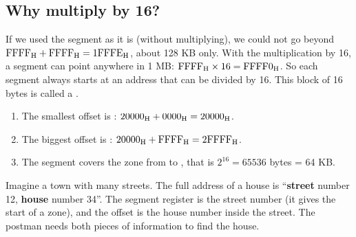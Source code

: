 \begin{center}
\end{center}

\subsection{Why multiply by 16?}
If we used the segment as it is (without multiplying), we could not go beyond $\mbox{FFFF\textsubscript{H}} + \mbox{FFFF\textsubscript{H}} = \mbox{1FFFE\textsubscript{H}}$,
about 128 KB only. With the multiplication by 16, a segment can point anywhere in 1 MB: $\mbox{FFFF\textsubscript{H}} \times 16 = \mbox{FFFF0\textsubscript{H}}$.
So each segment always starts at an address that can be divided by 16. This block of 16 bytes is called a
.

\begin{khatwa}[: which zone does the segment DS = 2000H cover?]
    \begin{enumerate}
        \item The smallest offset is : $\mbox{20000\textsubscript{H}} + \mbox{0000\textsubscript{H}} = \mbox{20000\textsubscript{H}}$.
        \item The biggest offset is : $\mbox{20000\textsubscript{H}} + \mbox{FFFF\textsubscript{H}} = \mbox{2FFFF\textsubscript{H}}$.
        \item The segment covers the zone from  to , that is $2^{16} = 65536$ bytes = 64 KB.
    \end{enumerate}
\end{khatwa}

\begin{tashbih}
    Imagine a town with many streets. The full address of a house is ``\textbf{street} number 12, \textbf{house}
    number 34''. The segment register is the street number (it gives the start of a zone), and the offset is the
    house number inside the street. The postman needs both pieces of information to find the house.
\end{tashbih}

